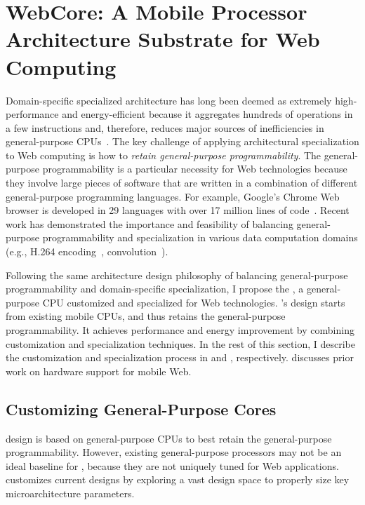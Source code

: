 
\chapter{WebCore: A Mobile Processor Architecture Substrate for Web Computing}
\label{sec:arch}

Domain-specific specialized architecture has long been deemed as extremely high-performance and energy-efficient because it aggregates hundreds of operations in a few instructions and, therefore, reduces major sources of inefficiencies in general-purpose CPUs~\cite{h264,soda,anysp}. The key challenge of applying architectural specialization to Web computing is how to \textit{retain general-purpose programmability}. The general-purpose programmability is a particular necessity for Web technologies because they involve large pieces of software that are written in a combination of different general-purpose programming languages. For example, Google's Chrome Web browser is developed in 29 languages with over 17 million lines of code~\cite{chromeloc}. Recent work has demonstrated the importance and feasibility of balancing general-purpose programmability and specialization in various data computation domains (e.g., H.264 encoding~\cite{h264}, convolution~\cite{ce}).

Following the same architecture design philosophy of balancing general-purpose programmability and domain-specific specialization, I propose the \webcore, a general-purpose CPU customized and specialized for Web technologies. \webcore's design starts from existing mobile CPUs, and thus retains the general-purpose programmability. It achieves performance and energy improvement by combining customization and specialization techniques. In the rest of this section, I describe the customization and specialization process in  and , respectively.  discusses prior work on hardware support for mobile Web.

\section{Customizing General-Purpose Cores}
\label{sec:arch:customization}

\webcore design is based on general-purpose CPUs to best retain the general-purpose programmability. However, existing general-purpose processors may not be an ideal baseline for \webcore, because they are not uniquely tuned for Web applications. \webcore customizes current designs by exploring a vast design space to properly size key microarchitecture parameters.

